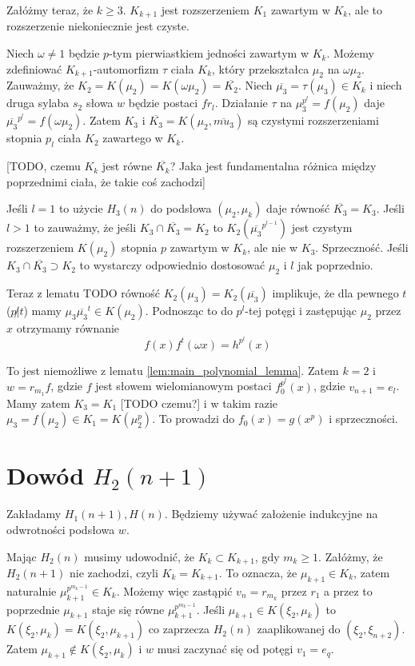 Załóżmy teraz, że $k \geq 3$. $K_{k+1}$ jest rozszerzeniem $K_1$ zawartym w
$K_k$, ale to rozszerzenie niekoniecznie jest czyste.

Niech $\omega \neq 1$ będzie $p$-tym pierwiastkiem jedności zawartym w $K_k$.
Możemy zdefiniować $K_{k+1}$-automorfizm $\tau$ ciała $K_k$, który przekształca
$\mu_2$ na $\omega \mu_2$. 
Zauważmy, że $K_2 = K\left(\mu_2\right) = K\left(\omega \mu_2\right) =
\overline{K_2}$.
Niech $\overline{\mu_3} = \tau(\mu_3) \in K_k$ i niech druga sylaba $s_2$ słowa
$w$ będzie postaci $fr_l$.
Działanie $\tau$ na $\mu_3^{p^l} = f\left(\mu_2\right)$ daje
$\overline{\mu_3}^{p^l} = f\left(\omega\mu_2\right)$. Zatem $K_3$ i
$\overline{K_3} = K\left(\mu_2, \overline{mu_3}\right)$ są czystymi
rozszerzeniami stopnia $p_l$ ciała $K_2$ zawartego w $K_k$.

[TODO, czemu $K_k$ jest równe $\overline{K_k}$? Jaka jest fundamentalna różnica
między poprzednimi ciała, że takie coś zachodzi]

Jeśli $l = 1$ to użycie $H_3(n)$ do podsłowa $\left(\mu_2, \mu_k\right)$ daje
równość $\overline{K_3} = K_3$. Jeśli $l > 1$ to zauważmy, że jeśli $K_3 \cap
\overline{K_3} = K_2$ to $K_2\left(\overline{\mu_3}^{p^{l-1}}\right)$ jest
czystym rozszerzeniem $K\left(\mu_2\right)$ stopnia $p$ zawartym w $K_k$, ale
nie w $K_3$. Sprzeczność. Jeśli $K_3 \cap \overline{K_3} \supset K_2$ to
wystarczy odpowiednio dostosować $\mu_2$ i $l$ jak poprzednio.

Teraz z lematu TODO równość $K_2\left(\mu_3\right) =
K_2\left(\overline{\mu_3}\right)$ implikuje, że dla pewnego $t$ ($p \not | t$)
mamy $\mu_3\overline{\mu_3}^t \in K\left(\mu_2\right)$. Podnosząc to do
$p^l$-tej potęgi i zastępując $\mu_2$ przez $x$ otrzymamy równanie
\[ f(x)f^t(\omega x) = h^{p^l}(x)\]

To jest niemożliwe z lematu \ref{lem:main_polynomial_lemma}. Zatem $k = 2$ i $w
= r_{m_1}f$, gdzie $f$ jest słowem wielomianowym postaci $f_0^{p^l}(x)$, gdzie
$v_{n+1} = e_l$. Mamy zatem $K_3 = K_1$ [TODO czemu?] i  w takim razie $\mu_3 =
f\left(\mu_2\right) \in K_1 = K\left(\mu_2^p\right)$. To prowadzi do $f_0(x) =
g\left(x^p\right)$ i sprzeczności.

\section{Dowód $H_2(n+1)$}
Zakładamy $H_1(n+1), H(n)$. Będziemy używać założenie indukcyjne na odwrotności
podsłowa $w$. 

Mając $H_2(n)$ musimy udowodnić, że $K_k \subset K_{k+1}$, gdy $m_k \geq 1$.
Załóżmy, że $H_2(n+1)$ nie zachodzi, czyli $K_k = K_{k+1}$. To oznacza, że
$\mu_{k+1} \in K_k$, zatem naturalnie $\mu_{k+1}^{p^{m_k -1}} \in K_k$. Możemy
więc zastąpić $v_n = r_{m_k}$ przez $r_1$ a przez to poprzednie $\mu_{k+1}$
staje się równe $\mu_{k+1}^{p^{m_k - 1}}$.
Jeśli $\mu_{k+1} \in K\left(\xi_2, \mu_k\right)$ to $K\left(\xi_2, \mu_k\right)
= K\left(\xi_2, \mu_{k+1}\right)$ co zaprzecza $H_2(n)$ zaaplikowanej do
$\left(\xi_2, \xi_{n+2}\right)$. Zatem $\mu_{k+1} \not \in K\left(\xi_2,
\mu_k\right)$ i $w$ musi zaczynać się od potęgi $v_1 = e_q$.

